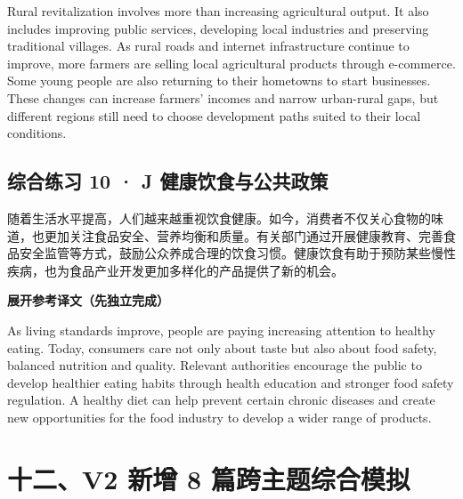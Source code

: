 \documentclass[a4paper,11pt,UTF8,fontset=none]{ctexart}
\begin{document}
\noindent Rural revitalization involves more than increasing agricultural output. It also includes improving public services, developing local industries and preserving traditional villages. As rural roads and internet infrastructure continue to improve, more farmers are selling local agricultural products through e-commerce. Some young people are also returning to their hometowns to start businesses. These changes can increase farmers’ incomes and narrow urban-rural gaps, but different regions still need to choose development paths suited to their local conditions.\par

\vspace{4pt}

\subsection{综合练习 10 · J 健康饮食与公共政策}

\par

\noindent 随着生活水平提高，人们越来越重视饮食健康。如今，消费者不仅关心食物的味道，也更加关注食品安全、营养均衡和质量。有关部门通过开展健康教育、完善食品安全监管等方式，鼓励公众养成合理的饮食习惯。健康饮食有助于预防某些慢性疾病，也为食品产业开发更加多样化的产品提供了新的机会。\par

\noindent\colorbox{HeadBlue}{\strut {\bfseries 展开参考译文（先独立完成）}}\par\vspace{1pt}

\noindent As living standards improve, people are paying increasing attention to healthy eating. Today, consumers care not only about taste but also about food safety, balanced nutrition and quality. Relevant authorities encourage the public to develop healthier eating habits through health education and stronger food safety regulation. A healthy diet can help prevent certain chronic diseases and create new opportunities for the food industry to develop a wider range of products.\par

\vspace{4pt}

\section{十二、V2 新增 8 篇跨主题综合模拟}
\end{document}
